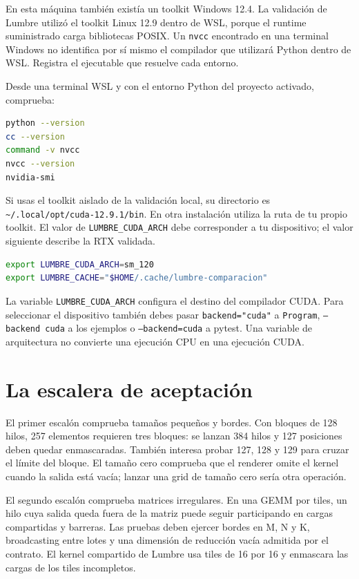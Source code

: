 \documentclass[12pt,a4paper,oneside]{report}
\begin{document}
En esta máquina también existía un toolkit Windows 12.4. La validación de Lumbre utilizó el toolkit Linux 12.9 dentro de WSL, porque el runtime suministrado carga bibliotecas POSIX. Un \texttt{nvcc} encontrado en una terminal Windows no identifica por sí mismo el compilador que utilizará Python dentro de WSL. Registra el ejecutable que resuelve cada entorno.

Desde una terminal WSL y con el entorno Python del proyecto activado, comprueba:

\begin{lstlisting}[language=bash]
python --version
cc --version
command -v nvcc
nvcc --version
nvidia-smi
\end{lstlisting}
Si usas el toolkit aislado de la validación local, su directorio es \texttt{\textasciitilde{}/.local/opt\allowbreak{}/cuda-12.9.1\allowbreak{}/bin}. En otra instalación utiliza la ruta de tu propio toolkit. El valor de \texttt{LUMBRE\_CUDA\_ARCH} debe corresponder a tu dispositivo; el valor siguiente describe la RTX validada.

\begin{lstlisting}[language=bash]
export LUMBRE_CUDA_ARCH=sm_120
export LUMBRE_CACHE="$HOME/.cache/lumbre-comparacion"
\end{lstlisting}
\begin{comprueba}
La variable \texttt{LUMBRE\_CUDA\_ARCH} configura el destino del compilador CUDA. Para seleccionar el dispositivo también debes pasar \texttt{backend="cuda"} a \texttt{Program}, \texttt{--backend cuda} a los ejemplos o \texttt{--backend=cuda} a pytest. Una variable de arquitectura no convierte una ejecución CPU en una ejecución CUDA.

\end{comprueba}
\section{La escalera de aceptación}
El primer escalón comprueba tamaños pequeños y bordes. Con bloques de 128 hilos, 257 elementos requieren tres bloques: se lanzan 384 hilos y 127 posiciones deben quedar enmascaradas. También interesa probar 127, 128 y 129 para cruzar el límite del bloque. El tamaño cero comprueba que el renderer omite el kernel cuando la salida está vacía; lanzar una grid de tamaño cero sería otra operación.

El segundo escalón comprueba matrices irregulares. En una GEMM por tiles, un hilo cuya salida queda fuera de la matriz puede seguir participando en cargas compartidas y barreras. Las pruebas deben ejercer bordes en M, N y K, broadcasting entre lotes y una dimensión de reducción vacía admitida por el contrato. El kernel compartido de Lumbre usa tiles de 16 por 16 y enmascara las cargas de los tiles incompletos.
\end{document}
